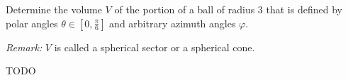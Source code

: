 \begin{exercise}
	Determine the volume $V$ of the portion of a ball of radius 3 that is defined by polar angles $\theta \in \left[0, \frac{\pi}{6}\right]$ and arbitrary azimuth angles $\varphi$.

	\emph{Remark:} $V$ is called a spherical sector or a spherical cone.
\end{exercise}

\begin{solution}
	TODO
\end{solution}
